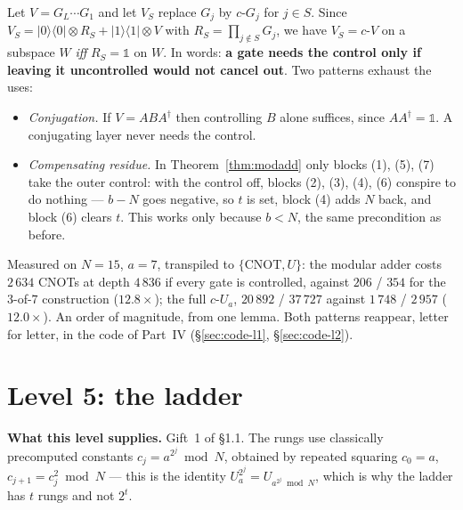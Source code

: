 \documentclass[11pt]{article}
\renewcommand{\ket}[1]{\lvert #1 \rangle}
\renewcommand{\bra}[1]{\langle #1 \rvert}
\newcommand{\CNOT}{\mathrm{CNOT}}
\newcommand{\id}{\mathbb{1}}
\theoremstyle{plain}
\theoremstyle{remark}
\begin{document}
\begin{keybox}[title={Where the outer control goes, and why not everywhere}]
Let $V=G_L\cdots G_1$ and let $V_S$ replace $G_j$ by $c\text{-}G_j$ for $j\in S$. Since
$V_S=\ket0\!\bra0\otimes R_S+\ket1\!\bra1\otimes V$ with $R_S=\prod_{j\notin S}G_j$, we have
$V_S=c\text{-}V$ on a subspace $W$ \emph{iff} $R_S=\id$ on $W$. In words: \textbf{a gate needs the
control only if leaving it uncontrolled would not cancel out}. Two patterns exhaust the uses:
\begin{itemize}\setlength\itemsep{1pt}
\item \emph{Conjugation.} If $V=ABA^\dagger$ then controlling $B$ alone suffices, since
$AA^\dagger=\id$. A conjugating layer never needs the control.
\item \emph{Compensating residue.} In Theorem~\ref{thm:modadd} only blocks (1), (5), (7) take the
outer control: with the control off, blocks (2), (3), (4), (6) conspire to do nothing --- $b-N$
goes negative, so $t$ is set, block (4) adds $N$ back, and block (6) clears $t$. This works only
because $b<N$, the same precondition as before.
\end{itemize}
Measured on $N=15$, $a=7$, transpiled to $\{\CNOT,U\}$: the modular adder costs $2\,634$ CNOTs at
depth $4\,836$ if every gate is controlled, against $206$ / $354$ for the $3$-of-$7$ construction
($12.8\times$); the full $c\text{-}U_a$, $20\,892$ / $37\,727$ against $1\,748$ / $2\,957$
($12.0\times$). An order of magnitude, from one lemma. Both patterns reappear, letter for letter,
in the code of Part~IV (\S\ref{sec:code-l1}, \S\ref{sec:code-l2}).
\end{keybox}

\section{Level 5: the ladder}\label{sec:l5}

\textbf{What this level supplies.} Gift~1 of \S1.1. The rungs use classically precomputed constants
$c_j=a^{2^j}\bmod N$, obtained by repeated squaring $c_0=a$, $c_{j+1}=c_j^2\bmod N$ --- this is the
identity $U_a^{2^j}=U_{a^{2^j}\bmod N}$, which is why the ladder has $t$ rungs and not $2^t$.
\end{document}
